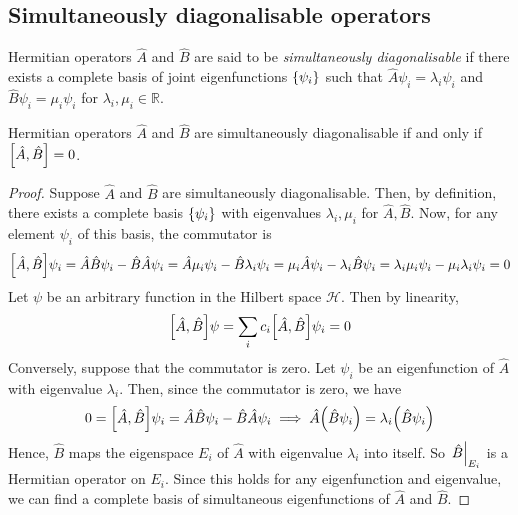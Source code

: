 \subsection{Simultaneously diagonalisable operators}
\begin{definition}
	Hermitian operators \( \hat A \) and \( \hat B \) are said to be \textit{simultaneously diagonalisable} if there exists a complete basis of joint eigenfunctions \( \qty{\psi_i} \) such that \( \hat A \psi_i = \lambda_i \psi_i \) and \( \hat B \psi_i = \mu_i \psi_i \) for \( \lambda_i, \mu_i \in \mathbb R \).
\end{definition}
\begin{theorem}
	Hermitian operators \( \hat A \) and \( \hat B \) are simultaneously diagonalisable if and only if \( \qty[\hat A, \hat B] = 0 \).
\end{theorem}
\begin{proof}
	Suppose \( \hat A \) and \( \hat B \) are simultaneously diagonalisable.
	Then, by definition, there exists a complete basis \( \qty{\psi_i} \) with eigenvalues \( \lambda_i, \mu_i \) for \( \hat A, \hat B \).
	Now, for any element \( \psi_i \) of this basis, the commutator is
	\[
		\qty[\hat A, \hat B] \psi_i = \hat A \hat B \psi_i - \hat B \hat A \psi_i = \hat A \mu_i \psi_i - \hat B \lambda_i \psi_i = \mu_i \hat A \psi_i - \lambda_i \hat B \psi_i = \lambda_i \mu_i \psi_i - \mu_i \lambda_i \psi_i = 0
	\]
	Let \( \psi \) be an arbitrary function in the Hilbert space \( \mathcal H \).
	Then by linearity,
	\[
		\qty[\hat A, \hat B] \psi = \sum_i c_i \qty[\hat A, \hat B]\psi_i = 0
	\]
	Conversely, suppose that the commutator is zero.
	Let \( \psi_i \) be an eigenfunction of \( \hat A \) with eigenvalue \( \lambda_i \).
	Then, since the commutator is zero, we have
	\[
		0 = \qty[\hat A, \hat B] \psi_i = \hat A \hat B \psi_i - \hat B \hat A \psi_i \implies \hat A\qty(\hat B \psi_i) = \lambda_i \qty(\hat B \psi_i)
	\]
	Hence, \( \hat B \) maps the eigenspace \( E_i \) of \( \hat A \) with eigenvalue \( \lambda_i \) into itself.
	So \( \eval{\hat B}_{E_i} \) is a Hermitian operator on \( E_i \).
	Since this holds for any eigenfunction and eigenvalue, we can find a complete basis of simultaneous eigenfunctions of \( \hat A \) and \( \hat B \).
\end{proof}

